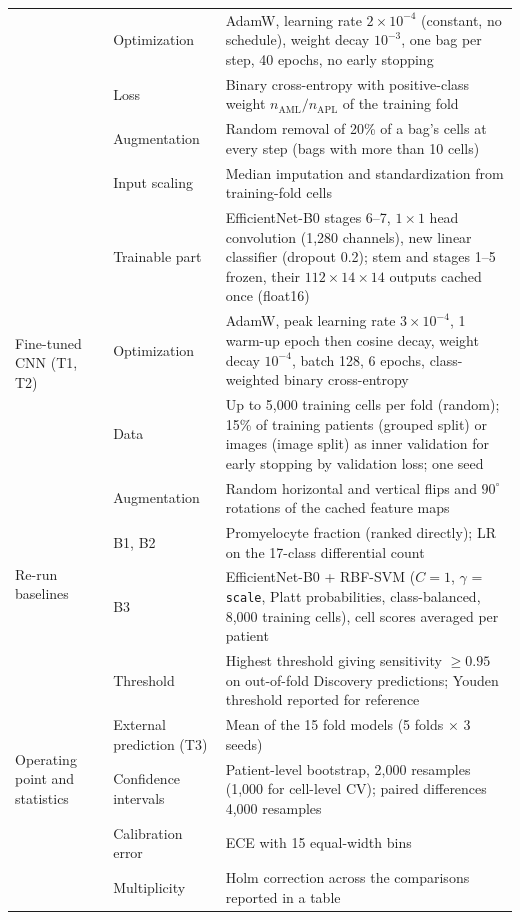 {\begin{longtable}{p{3.0cm}p{5.6cm}p{8.3cm}}
 & Optimization & AdamW, learning rate $2\times10^{-4}$ (constant, no schedule), weight decay $10^{-3}$, one bag per step, 40 epochs, no early stopping \\
 & Loss & Binary cross-entropy with positive-class weight $n_{\mathrm{AML}}/n_{\mathrm{APL}}$ of the training fold \\
 & Augmentation & Random removal of 20\% of a bag's cells at every step (bags with more than 10 cells) \\
 & Input scaling & Median imputation and standardization from training-fold cells \\
\midrule
\multirow{4}{3.0cm}{Fine-tuned CNN (T1, T2)} & Trainable part & EfficientNet-B0 stages 6--7, $1\times1$ head convolution (1,280 channels), new linear classifier (dropout 0.2); stem and stages 1--5 frozen, their $112\times14\times14$ outputs cached once (float16) \\
 & Optimization & AdamW, peak learning rate $3\times10^{-4}$, 1 warm-up epoch then cosine decay, weight decay $10^{-4}$, batch 128, 6 epochs, class-weighted binary cross-entropy \\
 & Data & Up to 5,000 training cells per fold (random); 15\% of training patients (grouped split) or images (image split) as inner validation for early stopping by validation loss; one seed \\
 & Augmentation & Random horizontal and vertical flips and $90^{\circ}$ rotations of the cached feature maps \\
\midrule
\multirow{2}{3.0cm}{Re-run baselines} & B1, B2 & Promyelocyte fraction (ranked directly); LR on the 17-class differential count \\
 & B3 & EfficientNet-B0 + RBF-SVM ($C=1$, $\gamma$ = \texttt{scale}, Platt probabilities, class-balanced, 8,000 training cells), cell scores averaged per patient \\
\midrule
\multirow{5}{3.0cm}{Operating point and statistics} & Threshold & Highest threshold giving sensitivity $\ge0.95$ on out-of-fold Discovery predictions; Youden threshold reported for reference \\
 & External prediction (T3) & Mean of the 15 fold models (5 folds $\times$ 3 seeds) \\
 & Confidence intervals & Patient-level bootstrap, 2,000 resamples (1,000 for cell-level CV); paired differences 4,000 resamples \\
 & Calibration error & ECE with 15 equal-width bins \\
 & Multiplicity & Holm correction across the comparisons reported in a table \\

\end{longtable}}
